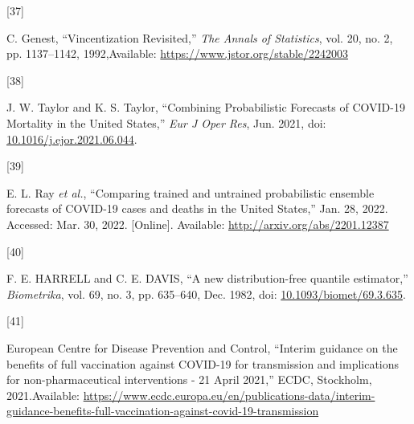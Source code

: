 \documentclass[
]{article}
\newlength{\cslhangindent}
\newlength{\csllabelwidth}
\newlength{\cslentryspacingunit} %
\newenvironment{CSLReferences}[2] %
 {%
  \setlength{\parindent}{0pt}
  \ifodd #1
  \let\oldpar\par
  \def\par{\hangindent=\cslhangindent\oldpar}
  \fi
  \setlength{\parskip}{#2\cslentryspacingunit}
 }%
 {}
\newcommand{\CSLLeftMargin}[1]{\parbox[t]{\csllabelwidth}{#1}}
\newcommand{\CSLRightInline}[1]{\parbox[t]{\linewidth - \csllabelwidth}{#1}\break}
\providecommand{\DIFaddbegin}{} %
\providecommand{\DIFaddend}{} %
\providecommand{\DIFdelbegin}{} %
\providecommand{\DIFdelend}{} %
\newcommand{\DIFscaledelfig}{0.5}
\newlength{\DIFdelgraphicswidth} %
\newlength{\DIFdelgraphicsheight} %
\newcommand{\DIFaddincludegraphics}[2][]{{\color{blue}\fbox{\DIFOincludegraphics[#1]{#2}}}} %
\newcommand{\DIFdelincludegraphics}[2][]{%
\sbox{\DIFdelgraphicsbox}{\DIFOincludegraphics[#1]{#2}}%
\settoboxwidth{\DIFdelgraphicswidth}{\DIFdelgraphicsbox} %
\settoboxtotalheight{\DIFdelgraphicsheight}{\DIFdelgraphicsbox} %
\scalebox{\DIFscaledelfig}{%
\parbox[b]{\DIFdelgraphicswidth}{\usebox{\DIFdelgraphicsbox}\\[-\baselineskip] \rule{\DIFdelgraphicswidth}{0em}}\llap{\resizebox{\DIFdelgraphicswidth}{\DIFdelgraphicsheight}{%
\setlength{\unitlength}{\DIFdelgraphicswidth}%
\begin{picture}(1,1)%
\thicklines\linethickness{2pt} %
{\color[rgb]{1,0,0}\put(0,0){\framebox(1,1){}}}%
{\color[rgb]{1,0,0}\put(0,0){\line( 1,1){1}}}%
{\color[rgb]{1,0,0}\put(0,1){\line(1,-1){1}}}%
\end{picture}%
}\hspace*{3pt}}} %
} %
\DeclareRobustCommand{\DIFaddbegin}{\DIFOaddbegin \let\includegraphics\DIFaddincludegraphics} %
\DeclareRobustCommand{\DIFaddend}{\DIFOaddend \let\includegraphics\DIFOincludegraphics} %
\DeclareRobustCommand{\DIFdelbegin}{\DIFOdelbegin \let\includegraphics\DIFdelincludegraphics} %
\DeclareRobustCommand{\DIFdelend}{\DIFOaddend \let\includegraphics\DIFOincludegraphics} %
\begin{document}
\begin{CSLReferences}{0}{0}
\leavevmode{}%
\DIFdelbegin %
\DIFdelend \DIFaddbegin \CSLLeftMargin{{[}37{]} }
\DIFaddend \CSLRightInline{C. Genest, {``Vincentization {Revisited},''} \emph{The Annals of Statistics}, vol. 20, no. 2, pp. 1137--1142, 1992,Available: \url{https://www.jstor.org/stable/2242003}}

\leavevmode{}%
\DIFdelbegin %
\DIFdelend \DIFaddbegin \CSLLeftMargin{{[}38{]} }
\DIFaddend \CSLRightInline{J. W. Taylor and K. S. Taylor, {``Combining {Probabilistic Forecasts} of {COVID-19 Mortality} in the {United States},''} \emph{Eur J Oper Res}, Jun. 2021, doi: \href{https://doi.org/10.1016/j.ejor.2021.06.044}{10.1016/j.ejor.2021.06.044}.}

\leavevmode{}%
\DIFdelbegin %
\DIFdelend \DIFaddbegin \CSLLeftMargin{{[}39{]} }
\DIFaddend \CSLRightInline{E. L. Ray \emph{et al.}, {``Comparing trained and untrained probabilistic ensemble forecasts of {COVID-19} cases and deaths in the {United States},''} Jan. 28, 2022. Accessed: Mar. 30, 2022. {[}Online{]}. Available: \url{http://arxiv.org/abs/2201.12387}}

\leavevmode{}%
\DIFdelbegin %
\DIFdelend \DIFaddbegin \CSLLeftMargin{{[}40{]} }
\DIFaddend \CSLRightInline{F. E. HARRELL and C. E. DAVIS, {``A new distribution-free quantile estimator,''} \emph{Biometrika}, vol. 69, no. 3, pp. 635--640, Dec. 1982, doi: \href{https://doi.org/10.1093/biomet/69.3.635}{10.1093/biomet/69.3.635}.}

\leavevmode{}%
\DIFdelbegin %
\DIFdelend \DIFaddbegin \CSLLeftMargin{{[}41{]} }
\DIFaddend \CSLRightInline{European Centre for Disease Prevention and Control, {``Interim guidance on the benefits of full vaccination against {COVID-19} for transmission and implications for non-pharmaceutical interventions - 21 {April} 2021,''} {ECDC}, {Stockholm}, 2021.Available: \url{https://www.ecdc.europa.eu/en/publications-data/interim-guidance-benefits-full-vaccination-against-covid-19-transmission}}


\end{CSLReferences}
\end{document}
